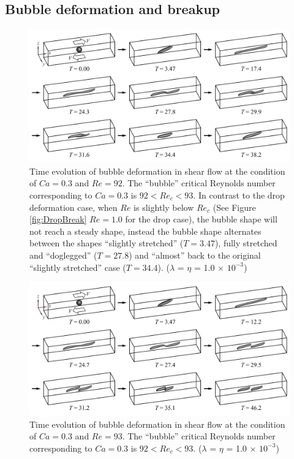 \documentclass[%
 reprint,
 showkeys,
 amsmath,amssymb,
 aps,
 prfluids,
 onecolumn
]{revtex4-2}
\begin{document}
\subsection{Bubble deformation and breakup}
% 
\begin{figure}%
  \centering
  \includegraphics[width=\textwidth]{BubbleBreakCa0p3Re92}
  \caption{Time evolution of bubble deformation in shear flow at the
           condition of $Ca=0.3$ and $Re=92$.  
	   The ``bubble'' 
	   critical Reynolds number corresponding to $Ca=0.3$ is
	   $92<Re_{c}<93$.  In contrast to the drop deformation case,
           when $Re$ is slightly below $Re_{c}$
           (See Figure \ref{fig:DropBreak} $Re=1.0$ for the drop case), 
           the bubble shape will
           not reach a steady shape, instead the bubble shape alternates
           between the shapes ``slightly stretched'' ($T=3.47$),
           fully stretched and ``doglegged'' ($T=27.8$) and ``almost''
           back to the original ``slightly stretched'' case 
           ($T=34.4$). 
           ($\lambda$ = $\eta$ = 1.0 $\times$ $10^{-3}$) 
	   }
  \label{fig:BubbleBreakCa0p3Re92}
\end{figure}
%
\begin{figure}%
  \centering
  \includegraphics[width=\textwidth]{BubbleBreakCa0p3Re93}
  \caption{Time evolution of bubble deformation in shear flow at the
           condition of $Ca=0.3$ and $Re=93$.
	   The ``bubble'' 
	   critical Reynolds number corresponding to $Ca=0.3$ is
	   $92<Re_{c}<93$.
           ($\lambda$ = $\eta$ = 1.0 $\times$ $10^{-3}$) 
	   }
  \label{fig:BubbleBreakCa0p3Re93}
\end{figure}
\end{document}
